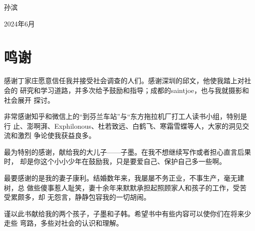 {\raggedleft

孙滨 \qquad\qquad \par

2024年6月 \quad}

\chapter{鸣谢}

感谢丁家庄愿意信任我并接受社会调查的人们。感谢深圳的邱文，他使我踏上对社会的
研究和学习道路，并多次给予鼓励和指导；成都的saintjoe，也与我就摄影和社会展开
探讨。

非常感谢知乎和微信上的“到芬兰车站”与“东方拖拉机厂打工人读书小组，特别是行
止、澎啊湃、Exphilonous、杜若致远、白鹤飞、寒霜雪蝶等人，大家的洞见交流和激烈
争论使我获益良多。


最为特别的感谢，献给我的大儿子——子墨。在我不想继续写作或者担心直言后果时，
却是你这个小小少年在鼓励我，只是要爱自己、保护自己多一些啊。

最要感谢的是我的妻子康利。结婚数年来，我屡屡不务正业，不事生产，毫无建树，总
做些傻事惹人耻笑，妻十余年来默默承担起照顾家人和孩子的工作，受苦受累颇多，却
无怨言，静静包容我的一切胡闹。

谨以此书献给我的两个孩子，子墨和子韩。希望书中有些内容可以使你们在将来少走些
弯路，多些对社会的认识和理解。






